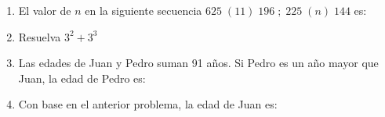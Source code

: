 \documentclass[10pt,twoside]{article}
\begin{document}
\begin{enumerate}
 \item El valor de $n$ en la siguiente secuencia $625\;(11)\;196\; ; \;225\;(n)\;144$ es:
 \item Resuelva $3^{2}+3^{3}$
 \item Las edades de Juan y Pedro suman 91 años. Si Pedro es un año mayor que Juan, la edad de Pedro es:
 \item Con base en el anterior problema, la edad de Juan es:
 \end{enumerate}
\end{document}
